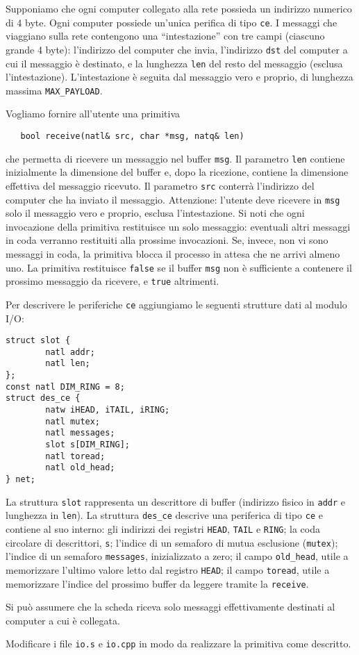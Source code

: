 Supponiamo che ogni computer collegato alla rete possieda un indirizzo numerico di 4 byte.
Ogni computer possiede un'unica perifica di tipo \verb|ce|.
I messaggi che viaggiano sulla rete contengono una ``intestazione'' con tre campi (ciascuno grande 4 byte): l'indirizzo del computer che
invia, l'indirizzo \verb|dst| del computer a cui il messaggio \`e destinato, e la lunghezza \verb|len| del resto del messaggio
(esclusa l'intestazione). L'intestazione \`e seguita dal messaggio vero e proprio, di lunghezza massima \verb|MAX_PAYLOAD|.

Vogliamo fornire all'utente una primitiva 
\begin{verbatim}
   bool receive(natl& src, char *msg, natq& len)
\end{verbatim}
che permetta di ricevere un messaggio nel buffer \verb|msg|. Il parametro \verb|len| contiene inizialmente
la dimensione del buffer e, dopo la ricezione, contiene la dimensione effettiva del messaggio ricevuto.
Il parametro \verb|src| conterr\`a l'indirizzo del computer che ha inviato il messaggio. 
Attenzione: l'utente deve ricevere in \verb|msg| solo il messaggio vero e proprio, esclusa l'intestazione.
Si noti che ogni invocazione della primitiva restituisce un solo messaggio: eventuali altri messaggi
in coda verranno restituiti alla prossime invocazioni. Se, invece, non vi sono messaggi in coda, la
primitiva blocca il processo in attesa che ne arrivi almeno uno.
La primitiva restituisce \verb|false| se il buffer \verb|msg| non \`e sufficiente a contenere il prossimo
messaggio da ricevere, e \verb|true| altrimenti.

Per descrivere le periferiche \verb|ce| aggiungiamo le seguenti strutture dati al modulo I/O:
\begin{verbatim}
struct slot {
        natl addr;
        natl len;
};
const natl DIM_RING = 8;
struct des_ce {
        natw iHEAD, iTAIL, iRING;
        natl mutex;
        natl messages;
        slot s[DIM_RING];
        natl toread;
        natl old_head;
} net;
\end{verbatim}
La struttura \verb|slot| rappresenta un descrittore di buffer (indirizzo fisico in \verb|addr| e lunghezza
in \verb|len|).
La struttura \verb|des_ce| descrive una periferica di tipo \verb|ce| e contiene al suo interno: gli indirizzi
dei registri \verb|HEAD|, \verb|TAIL| e \verb|RING|; la coda circolare di descrittori, \verb|s|;
l'indice di un semaforo di mutua esclusione (\verb|mutex|); l'indice di un semaforo
\verb|messages|, inizializzato a zero; il campo \verb|old_head|, utile a memorizzare
l'ultimo valore letto dal registro \verb|HEAD|; il campo \verb|toread|, utile a memorizzare l'indice
del prossimo buffer da leggere tramite la \verb|receive|.

Si pu\`o assumere che la scheda riceva solo messaggi effettivamente
destinati al computer a cui \`e collegata.

Modificare i file \verb|io.s| e \verb|io.cpp| in modo da realizzare la primitiva come descritto.
